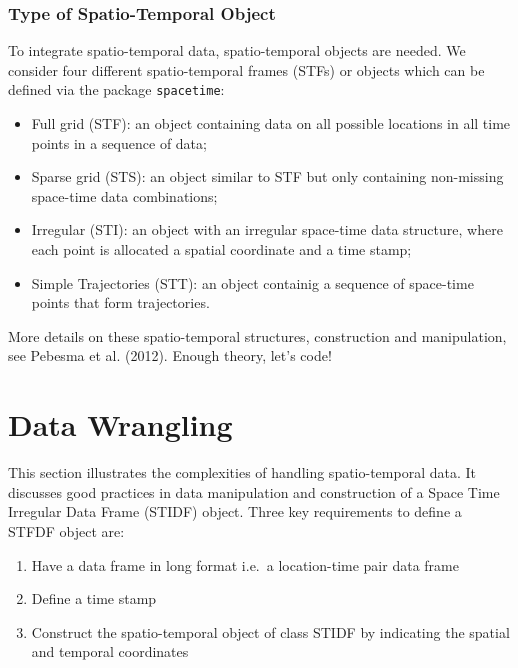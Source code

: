 \documentclass[
  letterpaper,
  krantz2]{style/krantz}
\begin{document}
\hypertarget{type-of-spatio-temporal-object}{%
\subsubsection{Type of Spatio-Temporal
Object}\label{type-of-spatio-temporal-object}}

To integrate spatio-temporal data, spatio-temporal objects are needed.
We consider four different spatio-temporal frames (STFs) or objects
which can be defined via the package \texttt{spacetime}:

\begin{itemize}
\item
  Full grid (STF): an object containing data on all possible locations
  in all time points in a sequence of data;
\item
  Sparse grid (STS): an object similar to STF but only containing
  non-missing space-time data combinations;
\item
  Irregular (STI): an object with an irregular space-time data
  structure, where each point is allocated a spatial coordinate and a
  time stamp;
\item
  Simple Trajectories (STT): an object containig a sequence of
  space-time points that form trajectories.
\end{itemize}

More details on these spatio-temporal structures, construction and
manipulation, see Pebesma et al. (2012). Enough theory, let's code!

\hypertarget{data-wrangling}{%
\section{Data Wrangling}\label{data-wrangling}}

This section illustrates the complexities of handling spatio-temporal
data. It discusses good practices in data manipulation and construction
of a Space Time Irregular Data Frame (STIDF) object. Three key
requirements to define a STFDF object are:

\begin{enumerate}
\def\labelenumi{\arabic{enumi}.}
\item
  Have a data frame in long format i.e.~a location-time pair data frame
\item
  Define a time stamp
\item
  Construct the spatio-temporal object of class STIDF by indicating the
  spatial and temporal coordinates
\end{enumerate}
\end{document}
